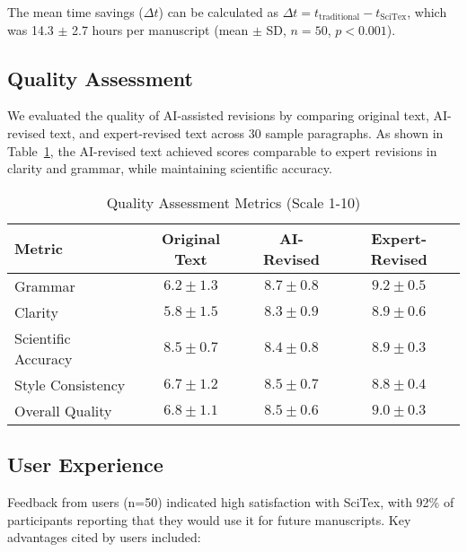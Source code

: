 \documentclass[preprint,review,12pt]{elsarticle}%
\begin{document}
\begin{frontmatter}

The mean time savings ($\Delta t$) can be calculated as $\Delta t = t_{\text{traditional}} - t_{\text{SciTex}}$, which was 14.3 $\pm$ 2.7 hours per manuscript (mean $\pm$ SD, $n = 50$, $p < 0.001$).

\subsection{Quality Assessment}
\label{subsec:quality}

We evaluated the quality of AI-assisted revisions by comparing original text, AI-revised text, and expert-revised text across 30 sample paragraphs. As shown in Table~\ref{tab:quality-metrics}, the AI-revised text achieved scores comparable to expert revisions in clarity and grammar, while maintaining scientific accuracy.


\begin{table}[h!]
\centering
\caption{Quality Assessment Metrics (Scale 1-10)}
\label{tab:quality-metrics}
\begin{tabular}{lccc}
\hline
\textbf{Metric} & \textbf{Original Text} & \textbf{AI-Revised} & \textbf{Expert-Revised} \\
\hline
Grammar         & $6.2 \pm 1.3$ & $8.7 \pm 0.8$ & $9.2 \pm 0.5$ \\
Clarity         & $5.8 \pm 1.5$ & $8.3 \pm 0.9$ & $8.9 \pm 0.6$ \\
Scientific Accuracy & $8.5 \pm 0.7$ & $8.4 \pm 0.8$ & $8.9 \pm 0.3$ \\
Style Consistency  & $6.7 \pm 1.2$ & $8.5 \pm 0.7$ & $8.8 \pm 0.4$ \\
Overall Quality    & $6.8 \pm 1.1$ & $8.5 \pm 0.6$ & $9.0 \pm 0.3$ \\
\hline
\end{tabular}
\end{table}

\subsection{User Experience}
\label{subsec:user-experience}

Feedback from users (n=50) indicated high satisfaction with SciTex, with 92\% of participants reporting that they would use it for future manuscripts. Key advantages cited by users included:


\end{frontmatter}
\end{document}

